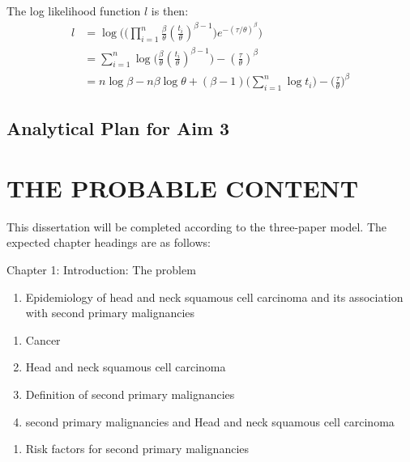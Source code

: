 \documentclass[12pt]{book}
\numberwithin{equation}{chapter}
\providecommand{\tightlist}{%
  \setlength{\itemsep}{0pt}\setlength{\parskip}{0pt}}
\begin{document}
The log likelihood function \(l\) is then:
\begin{equation}\label{logtau}
\begin{aligned}
l & = \log \Bigg(\Big(\prod_{i=1}^n\frac{\beta}{\theta}(\frac{t_i}{\theta})^{\beta - 1}\Big)e^{-(\tau/\theta)^\beta}\Bigg)\\
& = \sum_{i=1}^n\log\Big(\frac{\beta}{\theta}(\frac{t_i}{\theta})^{\beta - 1}\Big) - (\frac{\tau}{\theta})^\beta\\
& = n\log\beta - n\beta\log\theta + (\beta - 1)\bigg(\sum_{i=1}^n\log t_i\bigg) - \Big(\frac{\tau}{\theta}\Big)^\beta
\end{aligned}
\end{equation}

\hypertarget{analytical-plan-for-aim-3}{%
\section{Analytical Plan for Aim 3}\label{analytical-plan-for-aim-3}}

\hypertarget{the-probable-content}{%
\chapter{THE PROBABLE CONTENT}\label{the-probable-content}}

This dissertation will be completed according to the three-paper model. The expected chapter headings are as follows:

Chapter 1: Introduction: The problem

\begin{enumerate}
\def\labelenumi{\Alph{enumi}.}
\tightlist
\item
  Epidemiology of head and neck squamous cell carcinoma and its association with second primary malignancies
\end{enumerate}

\begin{enumerate}
\def\labelenumi{\arabic{enumi}.}
\tightlist
\item
  Cancer
\item
  Head and neck squamous cell carcinoma
\item
  Definition of second primary malignancies
\item
  second primary malignancies and Head and neck squamous cell carcinoma
\end{enumerate}

\begin{enumerate}
\def\labelenumi{\Alph{enumi}.}
\setcounter{enumi}{1}
\tightlist
\item
  Risk factors for second primary malignancies
\end{enumerate}
\end{document}
